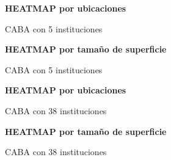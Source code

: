 \documentclass[a4paper, 10pt]{article}
\begin{document}
				\begin{figure}[H]
    				\centering
    				\textbf{HEATMAP por ubicaciones}\par\medskip
    				\caption{CABA con 5 instituciones}
				\end{figure}				
				\begin{figure}[H]
    				\centering
    				\textbf{HEATMAP por tamaño de superficie}\par\medskip
    				\caption{CABA con 5 instituciones}
				\end{figure}				
				\begin{figure}[H]
    				\centering
    				\textbf{HEATMAP por ubicaciones}\par\medskip
    				\caption{CABA con 38 instituciones}
				\end{figure}				
				\begin{figure}[H]
    				\centering
    				\textbf{HEATMAP por tamaño de superficie}\par\medskip
    				\caption{CABA con 38 instituciones}
				\end{figure}				
				
\end{document}
